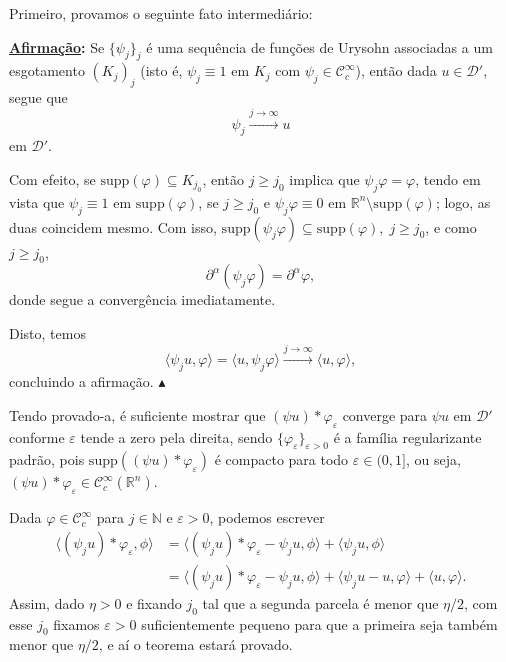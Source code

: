 \documentclass[../distribution_theory_notes.tex]{subfiles}
\begin{document}
\begin{proof*}
	Primeiro, provamos o seguinte fato intermediário:

	\textbf{\underline{Afirmação}:} Se \(\{\psi_{j}\}_{j}\) é uma sequência de funções de Urysohn associadas a um esgotamento \((K_{j})_{j}\) (isto é, \(\psi_{j}\equiv1\) em \(K_{j}\) com \(\psi_{j}\in \mathcal{C}_{c}^{\infty}\)), então dada \(u\in \mathcal{D}'\), segue que
	\[
		\psi_{j}\stackrel{j\to \infty}\longrightarrow u
	\]
	em \(\mathcal{D}'\).

	Com efeito, se \(\mathrm{supp}(\varphi )\subseteq K_{j_{0}}\), então \(j\geq j_{0}\) implica que \(\psi_{j}\varphi = \varphi \), tendo em vista que \(\psi_{j}\equiv 1\) em \(\mathrm{supp}(\varphi )\), se \(j\geq j_{0}\) e \(\psi_{j}\varphi \equiv 0\) em \(\mathbb{R}^{n}\setminus{\mathrm{supp}(\varphi )}\); logo, as duas coincidem mesmo. Com isso, \(\mathrm{supp}(\psi_{j}\varphi )\subseteq \mathrm{supp}(\varphi ),\; j\geq j_{0}\), e como \(j\geq j_{0}\),
	\[
		\partial^{\alpha }(\psi_{j}\varphi )=\partial^{\alpha }\varphi,
	\]
	donde segue a convergência imediatamente.

	Disto, temos
	\[
		\langle \psi_{j}u, \varphi  \rangle = \langle u, \psi_{j}\varphi  \rangle\stackrel{j\to \infty}\longrightarrow \langle u, \varphi  \rangle,
	\]
	concluindo a afirmação. \(\blacktriangle\)

	Tendo provado-a, é suficiente mostrar que \((\psi u)*\varphi_{\varepsilon }\) converge para \(\psi u\) em \(\mathcal{D}'\) conforme \(\varepsilon \) tende a zero pela direita, sendo \(\{\varphi_{\varepsilon }\}_{\varepsilon>0}\) é a família regularizante padrão, pois
	\(\mathrm{supp}((\psi u)*\varphi_{\varepsilon })\) é compacto para todo \(\varepsilon \in (0,1]\), ou seja, \((\psi u)*\varphi_{\varepsilon }\in \mathcal{C}_{c}^{\infty}(\mathbb{R}^{n})\).

	Dada \(\varphi \in \mathcal{C}_{c}^{\infty}\) para \(j\in \mathbb{N}\) e \(\varepsilon >0\), podemos escrever
	\begin{align*}
		\langle (\psi_{j}u)*\varphi_{\varepsilon }, \phi \rangle & = \langle (\psi_{j}u)*\varphi_{\varepsilon } - \psi_{j}u, \phi \rangle + \langle \psi_{j}u, \phi \rangle                                    \\
		                                                         & = \langle (\psi_{j}u)*\varphi_{\varepsilon }-\psi_{j}u, \phi \rangle + \langle \psi_{j}u-u, \varphi  \rangle + \langle u, \varphi  \rangle.
	\end{align*}
	Assim, dado \(\eta >0\) e fixando \(j_{0}\) tal que a segunda parcela é menor que \(\eta /2\), com esse \(j_{0}\) fixamos \(\varepsilon >0\) suficientemente pequeno para que a primeira seja também menor que \(\eta/2\), e aí o teorema estará provado.


\end{proof*}
\end{document}
